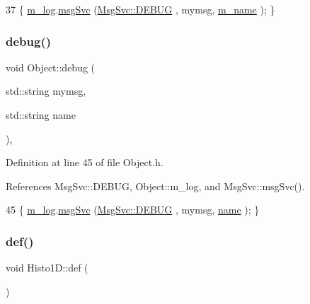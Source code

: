 \begin{DoxyCode}
37 \{ \hyperlink{classObject_a0d269813dd7ac1f24bc143031e2963f2}{m\_log}.\hyperlink{classMsgSvc_ad25f18047920cc59a314e5098259711c}{msgSvc} (\hyperlink{classMsgSvc_ae671eb7301996cd049d2da8a65925926a1dbdcc82dce88370ec335883c83b38b0}{MsgSvc::DEBUG}   , mymsg, \hyperlink{classObject_a8b83c95c705d2c3ba0d081fe1710f48d}{m\_name} ); \}
\end{DoxyCode}
\mbox{\label{classObject_a6c9a0397ca804e04d675ed05683f5420}} 
\subsubsection{\texorpdfstring{debug()}{debug()}\hspace{0.1cm}{\footnotesize\ttfamily [2/2]}}
{\footnotesize\ttfamily void Object\+::debug (\begin{DoxyParamCaption}\item[{std\+::string}]{mymsg,  }\item[{std\+::string}]{name }\end{DoxyParamCaption})\hspace{0.3cm}{\ttfamily [inline]}, {\ttfamily [inherited]}}



Definition at line 45 of file Object.\+h.



References Msg\+Svc\+::\+D\+E\+B\+UG, Object\+::m\+\_\+log, and Msg\+Svc\+::msg\+Svc().


\begin{DoxyCode}
45 \{ \hyperlink{classObject_a0d269813dd7ac1f24bc143031e2963f2}{m\_log}.\hyperlink{classMsgSvc_ad25f18047920cc59a314e5098259711c}{msgSvc} (\hyperlink{classMsgSvc_ae671eb7301996cd049d2da8a65925926a1dbdcc82dce88370ec335883c83b38b0}{MsgSvc::DEBUG}   , mymsg, \hyperlink{classObject_a300f4c05dd468c7bb8b3c968868443c1}{name} ); \}
\end{DoxyCode}
\mbox{\label{classHisto1D_a22b820e2c706d8e8614c31962f1ac6d0}} 
\subsubsection{\texorpdfstring{def()}{def()}}
{\footnotesize\ttfamily void Histo1\+D\+::def (\begin{DoxyParamCaption}{ }\end{DoxyParamCaption})}



